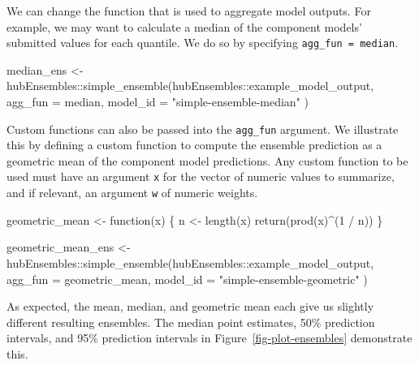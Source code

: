 \documentclass[
]{article}
\newenvironment{Shaded}{\begin{snugshade}}{\end{snugshade}}
\newcommand{\AttributeTok}[1]{\textcolor[rgb]{0.40,0.45,0.13}{#1}}
\newcommand{\ControlFlowTok}[1]{\textcolor[rgb]{0.00,0.23,0.31}{#1}}
\newcommand{\DecValTok}[1]{\textcolor[rgb]{0.68,0.00,0.00}{#1}}
\newcommand{\FunctionTok}[1]{\textcolor[rgb]{0.28,0.35,0.67}{#1}}
\newcommand{\NormalTok}[1]{\textcolor[rgb]{0.00,0.23,0.31}{#1}}
\newcommand{\OtherTok}[1]{\textcolor[rgb]{0.00,0.23,0.31}{#1}}
\newcommand{\SpecialCharTok}[1]{\textcolor[rgb]{0.37,0.37,0.37}{#1}}
\newcommand{\StringTok}[1]{\textcolor[rgb]{0.13,0.47,0.30}{#1}}
\begin{document}
We can change the function that is used to aggregate model outputs. For
example, we may want to calculate a median of the component models'
submitted values for each quantile. We do so by specifying
\texttt{agg\_fun\ =\ median}.

\begin{Shaded}
\begin{Highlighting}[]
\NormalTok{median\_ens }\OtherTok{\textless{}{-}}\NormalTok{ hubEnsembles}\SpecialCharTok{::}\FunctionTok{simple\_ensemble}\NormalTok{(hubEnsembles}\SpecialCharTok{::}\NormalTok{example\_model\_output,}
  \AttributeTok{agg\_fun =}\NormalTok{ median,}
  \AttributeTok{model\_id =} \StringTok{"simple{-}ensemble{-}median"}
\NormalTok{)}
\end{Highlighting}
\end{Shaded}

Custom functions can also be passed into the \texttt{agg\_fun} argument.
We illustrate this by defining a custom function to compute the ensemble
prediction as a geometric mean of the component model predictions. Any
custom function to be used must have an argument \texttt{x} for the
vector of numeric values to summarize, and if relevant, an argument
\texttt{w} of numeric weights.

\begin{Shaded}
\begin{Highlighting}[]
\NormalTok{geometric\_mean }\OtherTok{\textless{}{-}} \ControlFlowTok{function}\NormalTok{(x) \{}
\NormalTok{  n }\OtherTok{\textless{}{-}} \FunctionTok{length}\NormalTok{(x)}
  \FunctionTok{return}\NormalTok{(}\FunctionTok{prod}\NormalTok{(x)}\SpecialCharTok{\^{}}\NormalTok{(}\DecValTok{1} \SpecialCharTok{/}\NormalTok{ n))}
\NormalTok{\}}

\NormalTok{geometric\_mean\_ens }\OtherTok{\textless{}{-}}
\NormalTok{  hubEnsembles}\SpecialCharTok{::}\FunctionTok{simple\_ensemble}\NormalTok{(hubEnsembles}\SpecialCharTok{::}\NormalTok{example\_model\_output,}
    \AttributeTok{agg\_fun =}\NormalTok{ geometric\_mean,}
    \AttributeTok{model\_id =} \StringTok{"simple{-}ensemble{-}geometric"}
\NormalTok{  )}
\end{Highlighting}
\end{Shaded}

As expected, the mean, median, and geometric mean each give us slightly
different resulting ensembles. The median point estimates, 50\%
prediction intervals, and 95\% prediction intervals in
Figure~\ref{fig-plot-ensembles} demonstrate this.
\end{document}
